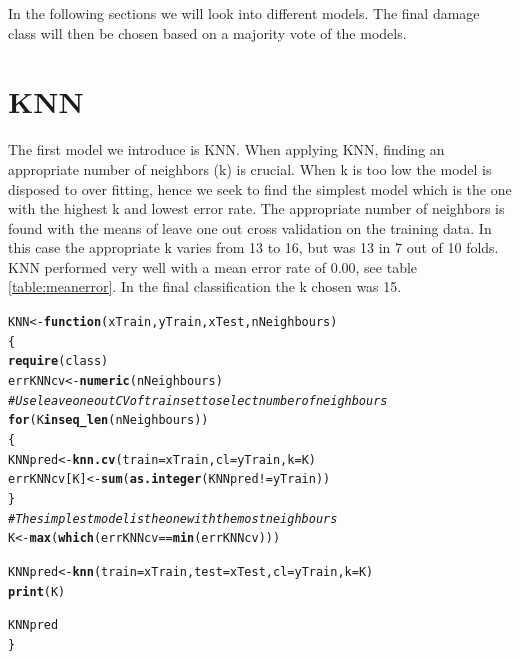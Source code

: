 \documentclass[a4paper,draft=false]{scrreprt}\usepackage[]{graphicx}\usepackage[]{color}
\makeatletter
\newcommand{\hlcom}[1]{\textcolor[rgb]{0.678,0.584,0.686}{\textit{#1}}}%
\newcommand{\hlopt}[1]{\textcolor[rgb]{0,0,0}{#1}}%
\newcommand{\hlstd}[1]{\textcolor[rgb]{0.345,0.345,0.345}{#1}}%
\newcommand{\hlkwa}[1]{\textcolor[rgb]{0.161,0.373,0.58}{\textbf{#1}}}%
\newcommand{\hlkwb}[1]{\textcolor[rgb]{0.69,0.353,0.396}{#1}}%
\newcommand{\hlkwc}[1]{\textcolor[rgb]{0.333,0.667,0.333}{#1}}%
\newcommand{\hlkwd}[1]{\textcolor[rgb]{0.737,0.353,0.396}{\textbf{#1}}}%
\newenvironment{kframe}{%
 \def\at@end@of@kframe{}%
 \ifinner\ifhmode%
  \def\at@end@of@kframe{\end{minipage}}%
  \begin{minipage}{\columnwidth}%
 \fi\fi%
 \def\FrameCommand##1{\hskip\@totalleftmargin \hskip-\fboxsep
 \colorbox{shadecolor}{##1}\hskip-\fboxsep
     \hskip-\linewidth \hskip-\@totalleftmargin \hskip\columnwidth}%
 \MakeFramed {\advance\hsize-\width
   \@totalleftmargin\z@ \linewidth\hsize
   \@setminipage}}%
 {\par\unskip\endMakeFramed%
 \at@end@of@kframe}
\newenvironment{knitrout}{}{} %
\makeatother
\begin{document}
In the following sections we will look into different models. The final damage class will then be chosen based on a majority vote of the models.


\section{KNN} %
The first model we introduce is KNN. When applying KNN, finding an appropriate number of neighbors (k) is crucial. When k is too low the model is disposed to over fitting, hence we seek to find the simplest model which is the one with the highest k and lowest error rate. The appropriate number of neighbors is found with the means of leave one out cross validation on the training data. In this case the appropriate k varies from 13 to 16, but was 13 in 7 out of 10 folds. KNN performed very well with a mean error rate of 0.00, see table \ref{table:meanerror}. In the final classification the k chosen was 15. 
\begin{knitrout}
\color{fgcolor}\begin{kframe}
\begin{alltt}
\hlstd{KNN} \hlkwb{<-} \hlkwa{function}\hlstd{(}\hlkwc{xTrain}\hlstd{,} \hlkwc{yTrain}\hlstd{,} \hlkwc{xTest}\hlstd{,} \hlkwc{nNeighbours}\hlstd{)}
\hlstd{\{}
  \hlkwd{require}\hlstd{(class)}
  \hlstd{errKNNcv} \hlkwb{<-} \hlkwd{numeric}\hlstd{(nNeighbours)}
  \hlcom{# Use leave one out CV of train set to select number of neighbours}
  \hlkwa{for} \hlstd{(K} \hlkwa{in} \hlkwd{seq_len}\hlstd{(nNeighbours))}
  \hlstd{\{}
    \hlstd{KNNpred} \hlkwb{<-} \hlkwd{knn.cv}\hlstd{(}\hlkwc{train} \hlstd{= xTrain,} \hlkwc{cl} \hlstd{= yTrain,} \hlkwc{k} \hlstd{= K)}
    \hlstd{errKNNcv[K]} \hlkwb{<-} \hlkwd{sum}\hlstd{(}\hlkwd{as.integer}\hlstd{(KNNpred} \hlopt{!=} \hlstd{yTrain))}
  \hlstd{\}}
  \hlcom{# The simplest model is the one with the most neighbours}
  \hlstd{K} \hlkwb{<-} \hlkwd{max}\hlstd{(}\hlkwd{which}\hlstd{(errKNNcv} \hlopt{==} \hlkwd{min}\hlstd{(errKNNcv)))}

  \hlstd{KNNpred} \hlkwb{<-} \hlkwd{knn}\hlstd{(}\hlkwc{train} \hlstd{= xTrain,} \hlkwc{test} \hlstd{= xTest,} \hlkwc{cl} \hlstd{= yTrain,} \hlkwc{k} \hlstd{= K)}
  \hlkwd{print}\hlstd{(K)}

  \hlstd{KNNpred}
\hlstd{\}}
\end{alltt}
\end{kframe}
\end{knitrout}
\end{document}

